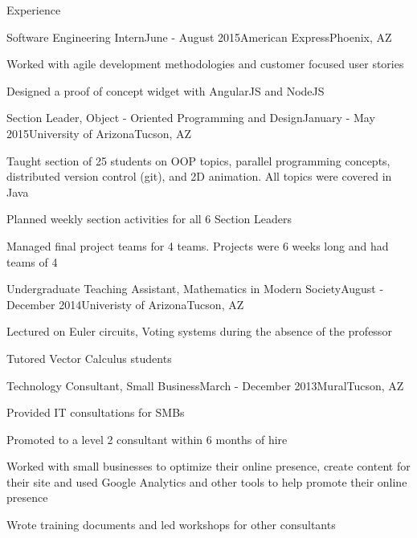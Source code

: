 \documentclass{resume} %
\begin{document}
\begin{rSection}{Experience}

\begin{rSubsection}{Software Engineering Intern}{June - August 2015}{American Express}{Phoenix, AZ}
\item Worked with agile development methodologies and customer focused user stories
\item Designed a proof of concept widget with AngularJS and NodeJS
\end{rSubsection}


\begin{rSubsection}{Section Leader, Object - Oriented Programming and Design}{January - May 2015}{University of Arizona}{Tucson, AZ}
\item Taught section of 25 students on OOP topics, parallel programming concepts, distributed version control (git), and 2D animation. All topics were covered in Java
\item Planned weekly section activities for all 6 Section Leaders
\item Managed final project teams for 4 teams. Projects were 6 weeks long and had teams of 4
\end{rSubsection}


\begin{rSubsection}{Undergraduate Teaching Assistant, Mathematics in Modern Society}{August - December 2014}{Univeristy of Arizona}{Tucson, AZ}
\item Lectured on Euler circuits, Voting systems during the absence of the professor
\item Tutored Vector Calculus students
\end{rSubsection}



\begin{rSubsection}{Technology Consultant, Small Business}{March - December 2013}{Mural}{Tucson, AZ}
	\item Provided IT consultations for SMBs
	\item Promoted to a level 2 consultant within 6 months of hire
	\item Worked with small businesses to optimize their online presence, create content for their site and used Google Analytics and other tools to help promote their online presence
	\item Wrote training documents and led workshops for other consultants
\end{rSubsection}


\end{rSection}
\end{document}
